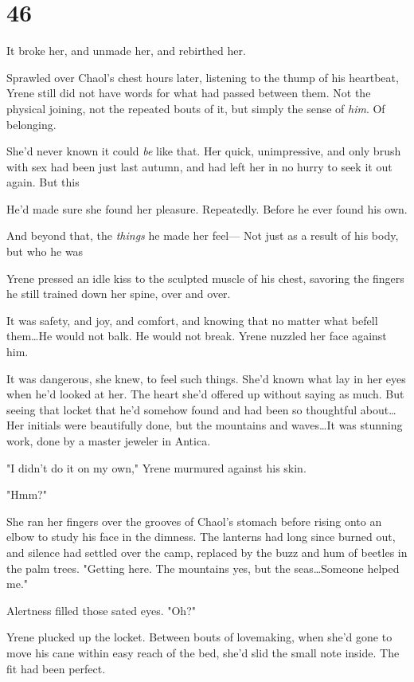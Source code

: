 
\chapter{46}

It broke her, and unmade her, and rebirthed her.

Sprawled over Chaol's chest hours later, listening to the thump of his heartbeat, Yrene still did not have words for what had passed between them.
Not the physical joining, not the repeated bouts of it, but simply the sense of \emph{him}.
Of belonging.

She'd never known it could \emph{be} like that.
Her quick, unimpressive, and only brush with sex had been just last autumn, and had left her in no hurry to seek it out again.
But this 

He'd made sure she found her pleasure.
Repeatedly.
Before he ever found his own.

And beyond that, the \emph{things} he made her feel--- Not just as a result of his body, but who he was 

Yrene pressed an idle kiss to the sculpted muscle of his chest, savoring the fingers he still trained down her spine, over and over.

It was safety, and joy, and comfort, and knowing that no matter what befell them\ldots He would not balk.
He would not break.
Yrene nuzzled her face against him.

It was dangerous, she knew, to feel such things.
She'd known what lay in her eyes when he'd looked at her.
The heart she'd offered up without saying as much.
But seeing that locket that he'd somehow found and had been so thoughtful about\ldots Her initials were beautifully done, but the mountains and waves\ldots It was stunning work, done by a master jeweler in Antica.

"I didn't do it on my own," Yrene murmured against his skin.

"Hmm?"

She ran her fingers over the grooves of Chaol's stomach before rising onto an elbow to study his face in the dimness.
The lanterns had long since burned out, and silence had settled over the camp, replaced by the buzz and hum of beetles in the palm trees.
"Getting here.
The mountains yes, but the seas\ldots Someone helped me."

Alertness filled those sated eyes.
"Oh?"

Yrene plucked up the locket.
Between bouts of lovemaking, when she'd gone to move his cane within easy reach of the bed, she'd slid the small note inside.
The fit had been perfect.

